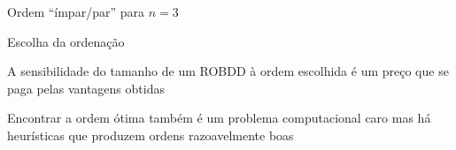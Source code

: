 \expandafter\documentclass\expandafter[table, usenames, svgnames, dvipsnames,14pt, \classopts]{beamer}
\begin{document}
\begin{frame}{Ordem ``ímpar/par'' para $n=3$}
\begin{figure}

    \end{figure}

\end{frame}

\begin{frame}{Escolha da ordenação}

    \begin{outline}
        \1 A sensibilidade do tamanho de um ROBDD à ordem escolhida é um preço que se paga pelas vantagens obtidas
        
        \vspace{1em}
        
        \1 Encontrar a ordem ótima também é um problema computacional caro
            \2[-] mas há heurísticas que produzem ordens razoavelmente boas
    \end{outline}

\end{frame}
\end{document}
